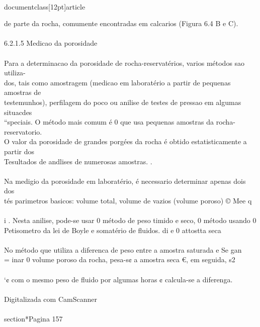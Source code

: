 \\documentclass[12pt]{article}
\begin{document}
de parte da rocha, comumente encontradas em calcarios (Figura 6.4 B e C).\\
\\
6.2.1.5 Medicao da porosidade\\
\\
Para a determinacao da porosidade de rocha-reservatérios, varios métodos sao utiliza-\\
dos, tais como amostragem (medicao em laboratério a partir de pequenas amostras de\\
testemunhos), perfilagem do poco ou anilise de testes de pressao em algumas situacdes\\
“speciais. O método mais comum é 0 que usa pequenas amostras da rocha-reservatorio.\\
O valor da porosidade de grandes porgées da rocha é obtido estatisticamente a partir dos\\
Tesultados de andlises de numerosas amostras. .\\
\\
Na medigio da porosidade em laboratério, é necessario determinar apenas dois dos\\
tés parimetros basicos: volume total, volume de vazios (volume poroso) © Mee q\\
\\
i . Nesta anilise, pode-se usar 0 método de peso timido e seco, 0 método usando 0\\
Petisometro da lei de Boyle e somatério de fluidos. di e 0 attostta seca\\
\\
No método que utiliza a diferenca de peso entre a amostra saturada e Se gan\\
= inar 0 volume poroso da rocha, pesa-s¢ a amostra seca €, em seguida, s2\\
\\
‘¢ com o mesmo peso de fluido por algumas horas ¢ calcula-se a diferenga.\\
\\
Digitalizada com CamScanner\\

\\section*{Pagina 157}
\end{document}
